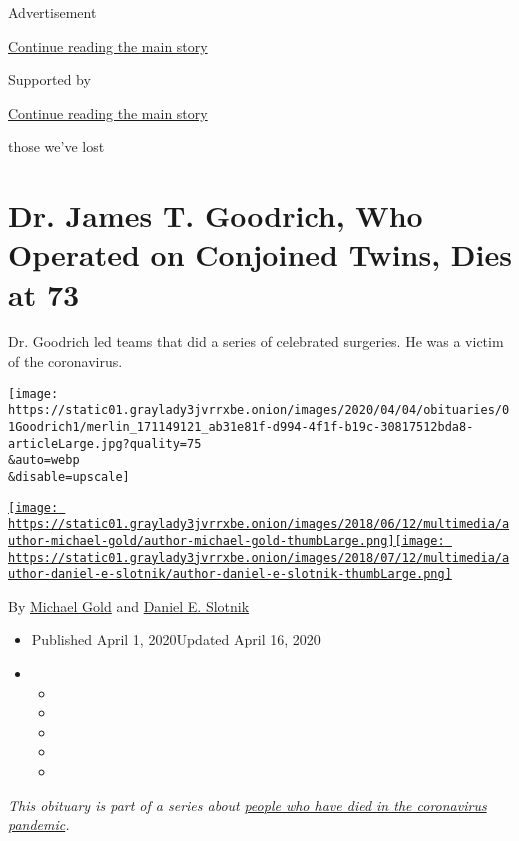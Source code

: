 Advertisement

\protect\hyperlink{after-top}{Continue reading the main story}

Supported by

\protect\hyperlink{after-sponsor}{Continue reading the main story}

those we've lost

\hypertarget{dr-james-t-goodrich-who-operated-on-conjoined-twins-dies-at-73}{%
\section{Dr. James T. Goodrich, Who Operated on Conjoined Twins, Dies at
73}\label{dr-james-t-goodrich-who-operated-on-conjoined-twins-dies-at-73}}

Dr. Goodrich led teams that did a series of celebrated surgeries. He was
a victim of the coronavirus.

\texttt{[image: https://static01.graylady3jvrrxbe.onion/images/2020/04/04/obituaries/01Goodrich1/merlin\_171149121\_ab31e81f-d994-4f1f-b19c-30817512bda8-articleLarge.jpg?quality=75\\\&auto=webp\\\&disable=upscale]}

\href{https://www.nytimes3xbfgragh.onion/by/michael-gold}{\texttt{[image: https://static01.graylady3jvrrxbe.onion/images/2018/06/12/multimedia/author-michael-gold/author-michael-gold-thumbLarge.png]}}\href{https://www.nytimes3xbfgragh.onion/by/daniel-e-slotnik}{\texttt{[image: https://static01.graylady3jvrrxbe.onion/images/2018/07/12/multimedia/author-daniel-e-slotnik/author-daniel-e-slotnik-thumbLarge.png]}}

By \href{https://www.nytimes3xbfgragh.onion/by/michael-gold}{Michael
Gold} and
\href{https://www.nytimes3xbfgragh.onion/by/daniel-e-slotnik}{Daniel E.
Slotnik}

\begin{itemize}
\item
  Published April 1, 2020Updated April 16, 2020
\item
  \begin{itemize}
  \item
  \item
  \item
  \item
  \item
  \end{itemize}
\end{itemize}

\emph{This obituary is part of a series about}
\href{https://www.nytimes3xbfgragh.onion/series/people-who-have-died-of-the-coronavirus}{\emph{people
who have died in the coronavirus pandemic}}\emph{.}

